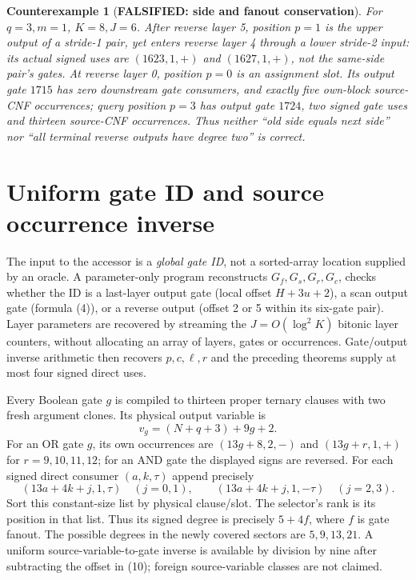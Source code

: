 \documentclass[11pt]{article}
\newtheorem{counterexample}[theorem]{Counterexample}
\begin{document}
\begin{counterexample}[\textbf{FALSIFIED: side and fanout conservation}]
For $q=3,m=1$, $K=8,J=6$. After reverse layer 5, position
$p=1$ is the \emph{upper} output of a stride-1 pair,
yet enters reverse layer 4 through a \emph{lower} stride-2
input: its actual signed uses are $(1623,1,+)$ and
$(1627,1,+)$, not the same-side pair's gates.
At reverse layer 0, position $p=0$ is an assignment slot.
Its output gate $1715$ has \emph{zero} downstream gate
consumers, and exactly five own-block source-CNF occurrences;
query position $p=3$ has output gate $1724$, two signed gate
uses and thirteen source-CNF occurrences. Thus neither
``old side equals next side'' nor ``all terminal reverse outputs
have degree two'' is correct.
\end{counterexample}

\section{Uniform gate ID and source occurrence inverse}
The input to the accessor is a \emph{global gate ID}, not a
sorted-array location supplied by an oracle. A parameter-only
program reconstructs $G_f,G_s,G_r,G_c$, checks whether the ID
is a last-layer output gate (local offset $H+3u+2$), a scan
output gate (formula (4)), or a reverse output (offset 2 or 5
within its six-gate pair). Layer parameters are recovered by
streaming the $J=O(\log^2K)$ bitonic layer counters, without
allocating an array of layers, gates or occurrences. Gate/output
inverse arithmetic then recovers $p,c,\ell,r$ and the preceding
theorems supply at most four signed direct uses.

Every Boolean gate $g$ is compiled to thirteen proper ternary
clauses with two fresh argument clones. Its physical output
variable is
\[
                 v_g=(N+q+3)+9g+2.                         \tag{10}
\]
For an OR gate $g$, its own occurrences are
$(13g+8,2,-)$ and $(13g+r,1,+)$ for $r=9,10,11,12$;
for an AND gate the displayed signs are reversed.
For each signed direct consumer $(a,k,\tau)$ append precisely
\[
  (13a+4k+j,1,\tau)\quad(j=0,1),\qquad
  (13a+4k+j,1,-\tau)\quad(j=2,3).                           \tag{11}
\]
Sort this constant-size list by physical clause/slot.
The selector's rank is its position in that list. Thus its
signed degree is precisely $5+4f$, where $f$ is gate fanout.
The possible degrees in the newly covered sectors are
$5,9,13,21$. A uniform source-variable-to-gate inverse is
available by division by nine after subtracting the offset
in (10); foreign source-variable classes are not claimed.
\end{document}
